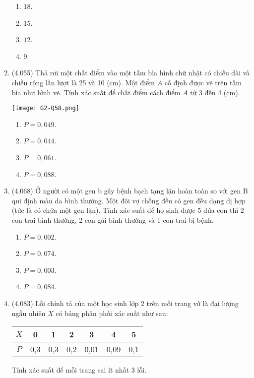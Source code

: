 \begin{enumerate}[label=\textbf{Câu \arabic*.},align=left,left=0cm..0cm,itemindent=*]
	\begin{enumerate}[label=\textbf{\Alph*.},align=left,left=1cm..0cm,itemindent=*]
		\item $18$. \item $15$. \item $12$. \item $9$.
	\end{enumerate}
	\item (4.055) Thả rơi một chất điểm vào một tấm bìa hình chữ nhật có chiều dài và chiều rộng lần lượt là 25 và 10 (cm). Một điểm $A$ cố định được vẽ trên tấm bìa như hình vẽ. Tính xác suất để chất điểm cách điểm $A$ từ 3 đến 4 (cm).\par
	{\centering\texttt{[image: G2-Q58.png]}\par}
	\begin{enumerate}[label=\textbf{\Alph*.},align=left,left=1cm..0cm,itemindent=*]
		\item $P=0,049$. \item $P=0,044$. \item $P=0,061$. \item $P=0,088$.
	\end{enumerate}
	\item (4.068) Ở người có một gen b gây bệnh bạch tạng lặn hoàn toàn so với gen B qui định màu da bình thường. Một đôi vợ chồng đều có gen đều dạng dị hợp (tức là có chứa một gen lặn). Tính xác suất để họ sinh được 5 đứa con thì 2 con trai bình thường, 2 con gái bình thường và 1 con trai bị bệnh.
	\begin{enumerate}[label=\textbf{\Alph*.},align=left,left=1cm..0cm,itemindent=*]
		\item $P=0,002$. \item $P=0,074$. \item $P=0,003$. \item $P=0,084$.
	\end{enumerate}
	\item (4.083) Lỗi chính tả của một học sinh lớp 2 trên mỗi trang vở là đại lượng ngẫu nhiên $X$ có bảng phân phối xác suất như sau:
	\begin{longtable}{|c|c|c|c|c|c|c|}\hline
	$X$ & 0   & 1   & 2   & 3    & 4    & 5   \\ \hline
	$P$ & 0,3 & 0,3 & 0,2 & 0,01 & 0,09 & 0,1 \\ \hline
	\end{longtable}
	Tính xác suất để mỗi trang sai ít nhất 3 lỗi.
	\begin{enumerate}[label=\textbf{\Alph*.},align=left,left=1cm..0cm,itemindent=*]

\end{enumerate}
\end{enumerate}
